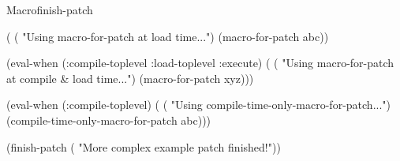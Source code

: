 \documentclass[10pt,twoside,english,pdftex]{article}
\begin{document}
\begin{functiondoc}{Macro}{finish-patch}{\superstar}
\begin{example}
  (
   ( "Using macro-for-patch at load time...")
   (macro-for-patch abc))

  (eval-when (:compile-toplevel :load-toplevel :execute)
    (
     ( "Using macro-for-patch at compile & load time...")
     (macro-for-patch xyz)))\goodpagebreak

  (eval-when (:compile-toplevel)
    (
     ( "Using compile-time-only-macro-for-patch...")
     (compile-time-only-macro-for-patch abc)))

  (finish-patch
   ( "More complex example patch finished!"))
\end{example}

\end{functiondoc}

\end{document}
